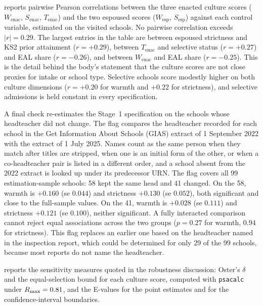 

 reports pairwise Pearson correlations between
the three enacted culture scores ($W_{\text{enac}}$,
$S_{\text{enac}}$, $T_{\text{enac}}$) and the two espoused scores
($W_{\text{esp}}$, $S_{\text{esp}}$) against each control variable,
estimated on the \NTierOne{} visited schools. No pairwise
correlation exceeds $|r| = 0.29$. The largest entries in the
table are between espoused strictness and KS2 prior attainment
($r = +0.29$), between $T_{\text{enac}}$ and selective status
($r = +0.27$) and EAL share ($r = -0.26$), and between $W_{\text{enac}}$
and EAL share ($r = -0.25$). This is the detail behind the
body's statement that the culture scores are not close proxies for intake
or school type. Selective
schools score modestly higher on both culture dimensions ($r = +0.20$ for
warmth and $+0.22$ for strictness), and selective admissions is held constant in every specification.



A final check re-estimates the Stage~1 specification on the schools whose headteacher did not change. The flag compares the headteacher recorded for each school in the Get Information About Schools (GIAS) extract of 1 September 2022 with the extract of 1 July 2025. Names count as the same person when they match after titles are stripped, when one is an initial form of the other, or when a co-headteacher pair is listed in a different order, and a school absent from the 2022 extract is looked up under its predecessor URN. The flag covers all 99 estimation-sample schools: 58 kept the same head and 41 changed. On the 58, warmth is $+0.160$ (se $0.044$) and strictness $+0.130$ (se $0.052$), both significant and close to the full-sample values. On the 41, warmth is $+0.028$ (se $0.111$) and strictness $+0.121$ (se $0.100$), neither significant. A fully interacted comparison cannot reject equal associations across the two groups ($p = 0.27$ for warmth, $0.94$ for strictness). This flag replaces an earlier one based on the headteacher named in the inspection report, which could be determined for only 29 of the 99 schools, because most reports do not name the headteacher.

 reports the sensitivity measures quoted in
the robustness discussion: Oster's $\delta$ and the equal-selection bound
for each culture score, computed with \texttt{psacalc} under
$R_{\max} = 0.81$, and the E-values for the point estimates and for
the confidence-interval boundaries.


